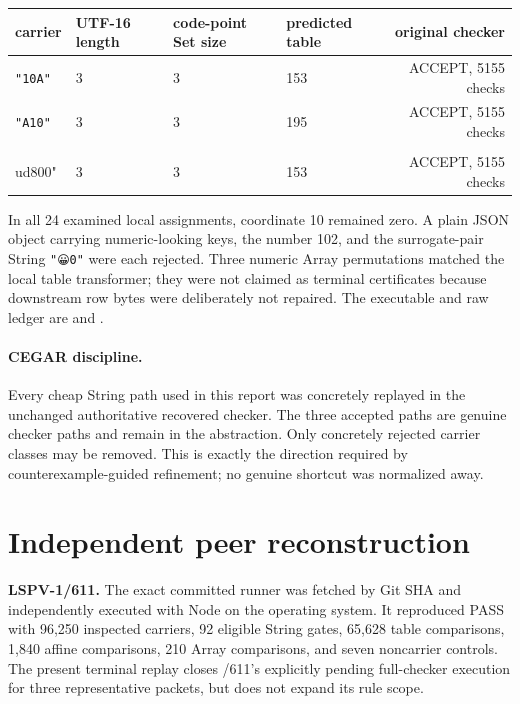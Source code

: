 \documentclass[11pt]{article}
\begin{document}
\begin{center}
\begin{tabular}{llllr}
\toprule
carrier & UTF-16 length & code-point Set size & predicted table & original checker\\
\midrule
\texttt{"10A"} & 3&3&153&ACCEPT, 5155 checks\\
\texttt{"A10"} & 3&3&195&ACCEPT, 5155 checks\\
\texttt{"10\\ud800"} & 3&3&153&ACCEPT, 5155 checks\\
\bottomrule
\end{tabular}
\end{center}
In all 24 examined local assignments, coordinate 10 remained zero.  A plain JSON object carrying numeric-looking keys, the number 102, and the surrogate-pair String \texttt{"😀0"} were each rejected.  Three numeric Array permutations matched the local table transformer; they were not claimed as terminal certificates because downstream row bytes were deliberately not repaired.  The executable and raw ledger are
 and
.

\paragraph{CEGAR discipline.}
Every cheap String path used in this report was concretely replayed in the unchanged authoritative recovered checker.  The three accepted paths are genuine checker paths and remain in the abstraction.  Only concretely rejected carrier classes may be removed.  This is exactly the direction required by counterexample-guided refinement; no genuine shortcut was normalized away.

\section{Independent peer reconstruction}
\textbf{LSPV-1/611.} The exact committed runner was fetched by Git SHA and independently executed with Node on the operating system.  It reproduced PASS with 96,250 inspected carriers, 92 eligible String gates, 65,628 table comparisons, 1,840 affine comparisons, 210 Array comparisons, and seven noncarrier controls.  The present terminal replay closes /611's explicitly pending full-checker execution for three representative packets, but does not expand its rule scope.
\end{document}
